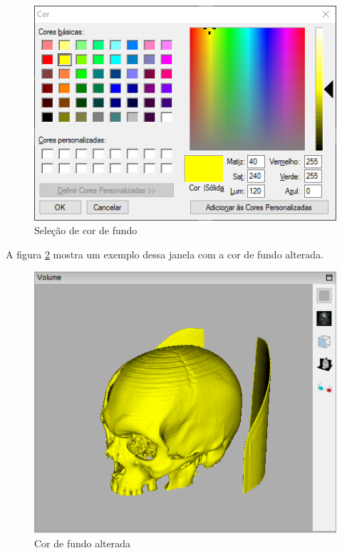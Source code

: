 \begin{figure}[!htb]
\centering
\includegraphics[scale=0.6]{../user_guide_figures/invesalius_screen/surface_select_color_windows_so_pt.png}
\caption{Seleção de cor de fundo}
\label{fig:color_window_background}
\end{figure}

A figura \ref{fig:background_color} mostra um exemplo dessa janela com a cor de fundo alterada.

\begin{figure}[!htb]
\centering
\includegraphics[scale=0.7]{../user_guide_figures/invesalius_screen/3d_background_changed.png}
\caption{Cor de fundo alterada}
\label{fig:background_color}
\end{figure}

\newpage

